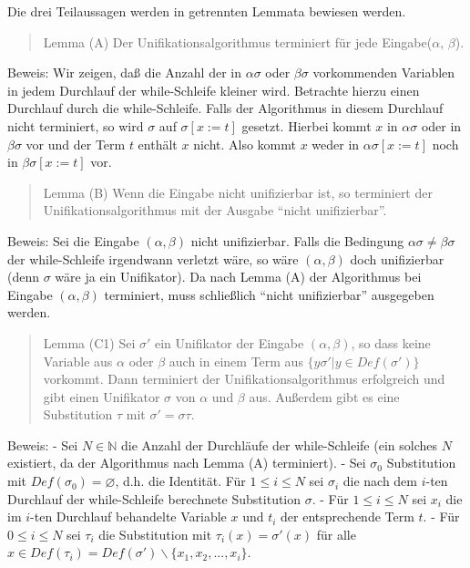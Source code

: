 \documentclass[a4paper]{article}
\begin{document}
\begin{multicols}{3}
  Die drei Teilaussagen werden in getrennten Lemmata bewiesen werden.

  \begin{quote}
    Lemma (A) Der Unifikationsalgorithmus terminiert für jede
    Eingabe($\alpha$, $\beta$).
  \end{quote}

  Beweis: Wir zeigen, daß die Anzahl der in $\alpha\sigma$ oder
  $\beta\sigma$ vorkommenden Variablen in jedem Durchlauf der
  while-Schleife kleiner wird. Betrachte hierzu einen Durchlauf durch die
  while-Schleife. Falls der Algorithmus in diesem Durchlauf nicht
  terminiert, so wird $\sigma$ auf $\sigma[x:=t]$ gesetzt. Hierbei kommt
  $x$ in $\alpha\sigma$ oder in $\beta\sigma$ vor und der Term $t$ enthält
  $x$ nicht. Also kommt $x$ weder in $\alpha\sigma[x:=t]$ noch in
  $\beta\sigma[x:=t]$ vor.

  \begin{quote}
    Lemma (B) Wenn die Eingabe nicht unifizierbar ist, so terminiert der
    Unifikationsalgorithmus mit der Ausgabe ``nicht unifizierbar''.
  \end{quote}

  Beweis: Sei die Eingabe $(\alpha,\beta)$ nicht unifizierbar. Falls die
  Bedingung $\alpha\sigma\not=\beta\sigma$ der while-Schleife irgendwann
  verletzt wäre, so wäre $(\alpha,\beta)$ doch unifizierbar (denn $\sigma$
  wäre ja ein Unifikator). Da nach Lemma (A) der Algorithmus bei Eingabe
  $(\alpha,\beta)$ terminiert, muss schließlich ``nicht unifizierbar''
  ausgegeben werden.

  \begin{quote}
    Lemma (C1) Sei $\sigma'$ ein Unifikator der Eingabe $(\alpha,\beta)$, so
    dass keine Variable aus $\alpha$ oder $\beta$ auch in einem Term aus
    $\{y\sigma'|y\in Def(\sigma')\}$ vorkommt. Dann terminiert der
    Unifikationsalgorithmus erfolgreich und gibt einen Unifikator $\sigma$
    von $\alpha$ und $\beta$ aus. Außerdem gibt es eine Substitution $\tau$
    mit $\sigma'=\sigma\tau$.
  \end{quote}

  Beweis: - Sei $N\in\mathbb{N}$ die Anzahl der Durchläufe der
  while-Schleife (ein solches $N$ existiert, da der Algorithmus nach Lemma
  (A) terminiert). - Sei $\sigma_0$ Substitution mit
  $Def(\sigma_0) =\varnothing$, d.h. die Identität. Für $1\leq i\leq N$
  sei $\sigma_i$ die nach dem $i$-ten Durchlauf der while-Schleife
  berechnete Substitution $\sigma$. - Für $1\leq i\leq N$ sei $x_i$ die im
  $i$-ten Durchlauf behandelte Variable $x$ und $t_i$ der entsprechende
  Term $t$. - Für $0\leq i\leq N$ sei $\tau_i$ die Substitution mit
  $\tau_i(x)=\sigma'(x)$ für alle
  $x\in Def(\tau_i) =Def(\sigma')\backslash\{x_1,x_2,...,x_i\}$.


\end{multicols}
\end{document}
